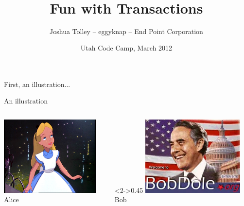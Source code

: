 \documentclass[svgnames]{beamer}
\begin{document}
\title{Fun with Transactions}
\author{Joshua Tolley -- eggyknap -- End Point Corporation}
\date{Utah Code Camp, March 2012}

\frame{\titlepage}

\begin{frame}
    \begin{centering}
    First, an illustration...
    \par
    \end{centering}
\end{frame}
\begin{frame}{An illustration}
    \begin{columns}[t]
        \begin{column}{0.45\textwidth}
            \includegraphics[height=4cm]{alice-9.jpg}
            \\ Alice
        \end{column}
        \begin{column}<2->{0.45\textwidth}
            \includegraphics[height=4cm]{bobdole_org.jpg}
            \\ Bob
        \end{column}
    \end{columns}
    \vspace{10pt}
\end{frame}
\end{document}
